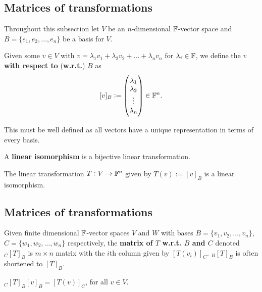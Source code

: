 \documentclass[../Year1/Year1.tex]{subfiles}
\begin{document}
\subsection{Matrices of transformations}
Throughout this subsection let $V$ be an $n$-dimensional $\mathbb{F}$-vector space and $B=\{e_1, e_2, \ldots, e_n\}$ be a basis for $V$.

\begin{definition}
    Given some $v\in V$ with $v = \lambda_1v_1 + \lambda_2v_2 + \dots + \lambda_nv_n$ for $\lambda_i\in\mathbb{F}$, we define the $v$ \textbf{with respect to} (\textbf{w.r.t.}) $B$ as \[
     [v]_B := \begin{pmatrix}
         \lambda_1 \\
         \lambda_2 \\
         \vdots \\
         \lambda_n
     \end{pmatrix} \in \mathbb{F}^n
     \textcolor{black}{.}
    \]
\end{definition}

\begin{remark}
    This must be well defined as all vectors have a unique representation in terms of every basis.
\end{remark}

\begin{definition}
    A \textbf{linear isomorphism} is a bijective linear transformation.
\end{definition}

\begin{theorem}
    The linear transformation $T:V\rightarrow\mathbb{F}^n$ given by $T(v):= [v]_B$ is a linear isomorphism.
\end{theorem}

\subsection{Matrices of transformations}
\begin{definition}
    Given finite dimensional $\mathbb{F}$-vector spaces $V$ and $W$ with bases $B = \{v_1,v_2,\ldots,v_n\}$, $C = \{w_1,w_2,\ldots,w_n\}$ respectively, the \textbf{matrix of $T$ w.r.t. $B$ and $C$} denoted $_C[T]_B$ is $m\times n$ matrix with the $i$th column given by $[T(v_i)]_C$. $_B[T]_B$ is often shortened to $[T]_B$.
\end{definition}

\begin{remark}
    $_C[T]_B[v]_B = [T(v)]_C$, for all $v\in V$.
\end{remark}
\end{document}
